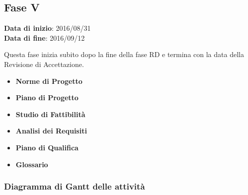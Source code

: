 	\subsection{Fase V}
	\begin{center}
		\textbf{Data di inizio}: 2016/08/31 \\
		\textbf{Data di fine}: 2016/09/12 \\
	\end{center}
	Questa fase inizia subito dopo la fine della fase RD e termina con la data della Revisione di Accettazione.
		\begin{itemize}
			\item \textbf{Norme di Progetto}
			\item \textbf{Piano di Progetto}
			\item \textbf{Studio di Fattibilità}
			\item \textbf{Analisi dei Requisiti}
			\item \textbf{Piano di Qualifica}
			\item \textbf{Glossario}
		\end{itemize}
		\subsubsection{Diagramma di Gantt delle attività}
	
